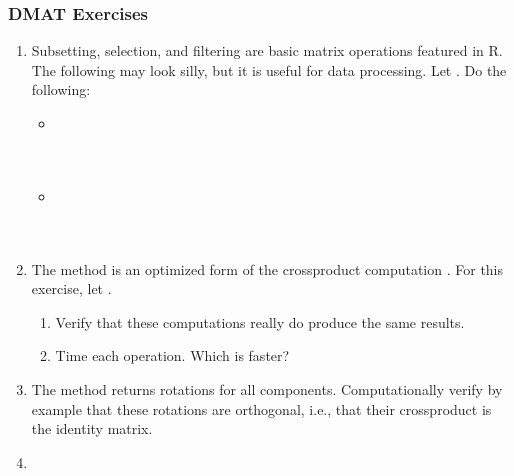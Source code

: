 \begin{frame}[fragile,allowframebreaks=.9]
\frametitle{DMAT Exercises}
\begin{enumerate}
  \item  Subsetting, selection, and filtering are basic matrix operations featured
  in R. The following may look silly, but it is useful for data
  processing.  Let .  Do the following:
  \begin{itemize}
  \item
     \\
     \\
  \\[.2cm]
  \item
     \\
     \\
     \\
  \end{itemize}

  \item The method  is an optimized form of the crossproduct computation .  For this exercise, let .
  \begin{enumerate}
    \item Verify that these computations really do produce the same results.
    \item Time each operation.  Which is faster?
  \end{enumerate}

  \item The  method returns rotations for all components.  Computationally verify by example that these rotations are orthogonal, i.e., that their crossproduct is the identity matrix.

  \item 
\end{enumerate}
\end{frame}